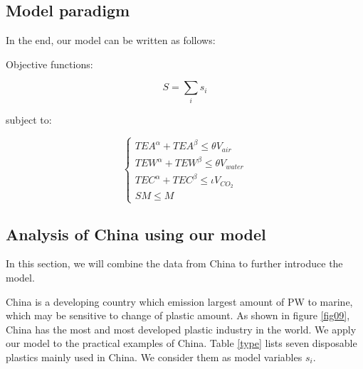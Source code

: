 \documentclass{mcmthesis}
\begin{document}

\subsection{Model paradigm}

In the end, our model can be written as follows:

Objective functions:

\begin{equation}
S = \sum_i{s_i}
\label{z}
\end{equation}

subject to:

\begin{equation}
\label{eq6}
\left\{
\begin{aligned}
TEA^\alpha + TEA^\beta \le \theta V_{air}\\
TEW^\alpha + TEW^\beta \le \theta V_{water}\\
TEC^\alpha + TEC^\beta \le \iota V_{CO_2}\\
SM \le M
\end{aligned}
\right.
\end{equation}

\subsection{Analysis of China using our model}

In this section, we will combine the data from China to further introduce the model.

China is a developing country which emission largest amount of PW to marine, which may be sensitive to change of plastic amount. As shown in figure \ref{fig09}, China has the most and most developed plastic industry in the world. We apply our model to the practical examples of China. Table \ref{type} lists seven disposable plastics mainly used in China. We consider them as model variables $s_i$.
\end{document}
